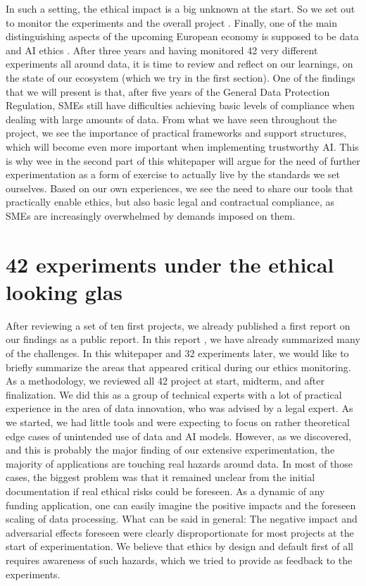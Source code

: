 In such a setting, the ethical impact is a big unknown at the start. So we set out to monitor the experiments and the overall project \cite{D3.1}. Finally, one of the main distinguishing aspects of the upcoming European economy is supposed to be data and AI ethics \cite{some digital strategy}.  After three years and having
monitored 42 very different experiments all around data, it is time to review and reflect on our learnings, on the state of our ecosystem (which we try in the first section). One of the findings that we will present is that, after five years of the General Data Protection Regulation, SMEs still have difficulties achieving basic levels of compliance when dealing with large amounts of data. From what we have seen throughout the project, we see the importance of practical frameworks and support structures, which will become even more important when implementing trustworthy AI. This is why wee in the second part of this whitepaper will argue for the need of further experimentation as a form of exercise to actually live by the standards we set ourselves. Based on our own experiences, we see the need to share our tools that practically enable ethics, 
but also basic legal and contractual compliance, as SMEs are increasingly overwhelmed by demands imposed on them.


\section{42 experiments under the ethical looking glas}\label{}

After reviewing a set of ten first projects, we already published a first report on our findings as a public report. In this report \cite{DXX}, we have already summarized many of the challenges. In this whitepaper and 32 experiments later, we would like to briefly summarize the areas that appeared critical during our ethics monitoring.
As a methodology, we reviewed all 42 project at start, midterm, and after finalization. We did this as a group of technical experts with a lot of practical experience in the area of data innovation, who was advised by a legal expert. As we started, we had little tools and were expecting to focus on rather theoretical edge cases of unintended use of data and AI models. However, as we discovered, and this is probably the major finding of our extensive experimentation, the majority of applications are touching real hazards around data. In most of those cases, the biggest problem was that it remained unclear from the initial documentation if real ethical risks could be foreseen. As a dynamic of any funding application, one can easily imagine the positive impacts and the foreseen scaling of data processing. What can be said in general: The negative impact and adversarial effects foreseen were clearly disproportionate for most projects at the start of experimentation. We believe that ethics by design and default first of all requires awareness of such hazards, which we tried to provide as feedback to the experiments.